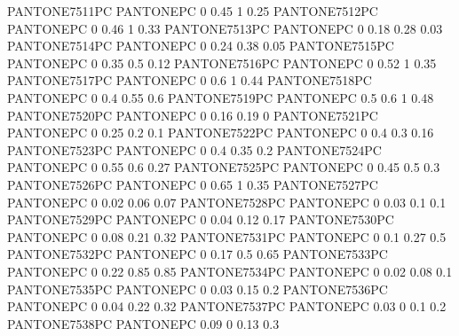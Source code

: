  {PANTONE7511PC} {PANTONE\SpotSpace PC} {0 0.45 1 0.25}
 {PANTONE7512PC} {PANTONE\SpotSpace PC} {0 0.46 1 0.33}
 {PANTONE7513PC} {PANTONE\SpotSpace PC} {0 0.18 0.28 0.03}
 {PANTONE7514PC} {PANTONE\SpotSpace PC} {0 0.24 0.38 0.05}
 {PANTONE7515PC} {PANTONE\SpotSpace PC} {0 0.35 0.5 0.12}
 {PANTONE7516PC} {PANTONE\SpotSpace PC} {0 0.52 1 0.35}
 {PANTONE7517PC} {PANTONE\SpotSpace PC} {0 0.6 1 0.44}
 {PANTONE7518PC} {PANTONE\SpotSpace PC} {0 0.4 0.55 0.6}
 {PANTONE7519PC} {PANTONE\SpotSpace PC} {0.5 0.6 1 0.48}
 {PANTONE7520PC} {PANTONE\SpotSpace PC} {0 0.16 0.19 0}
 {PANTONE7521PC} {PANTONE\SpotSpace PC} {0 0.25 0.2 0.1}
 {PANTONE7522PC} {PANTONE\SpotSpace PC} {0 0.4 0.3 0.16}
 {PANTONE7523PC} {PANTONE\SpotSpace PC} {0 0.4 0.35 0.2}
 {PANTONE7524PC} {PANTONE\SpotSpace PC} {0 0.55 0.6 0.27}
 {PANTONE7525PC} {PANTONE\SpotSpace PC} {0 0.45 0.5 0.3}
 {PANTONE7526PC} {PANTONE\SpotSpace PC} {0 0.65 1 0.35}
 {PANTONE7527PC} {PANTONE\SpotSpace PC} {0 0.02 0.06 0.07}
 {PANTONE7528PC} {PANTONE\SpotSpace PC} {0 0.03 0.1 0.1}
 {PANTONE7529PC} {PANTONE\SpotSpace PC} {0 0.04 0.12 0.17}
 {PANTONE7530PC} {PANTONE\SpotSpace PC} {0 0.08 0.21 0.32}
 {PANTONE7531PC} {PANTONE\SpotSpace PC} {0 0.1 0.27 0.5}
 {PANTONE7532PC} {PANTONE\SpotSpace PC} {0 0.17 0.5 0.65}
 {PANTONE7533PC} {PANTONE\SpotSpace PC} {0 0.22 0.85 0.85}
 {PANTONE7534PC} {PANTONE\SpotSpace PC} {0 0.02 0.08 0.1}
 {PANTONE7535PC} {PANTONE\SpotSpace PC} {0 0.03 0.15 0.2}
 {PANTONE7536PC} {PANTONE\SpotSpace PC} {0 0.04 0.22 0.32}
 {PANTONE7537PC} {PANTONE\SpotSpace PC} {0.03 0 0.1 0.2}
 {PANTONE7538PC} {PANTONE\SpotSpace PC} {0.09 0 0.13 0.3}
